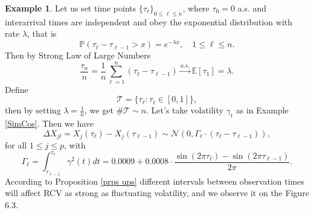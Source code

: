 \documentclass[a4paper,11pt]{book}
\theoremstyle{plain}
\theoremstyle{definition}
\newtheorem{exmp}[thm]{Example}
\newcommand{\ME}{\mathbb{E}}
\newcommand{\MP}{\mathbb{P}}
\begin{document}
    \begin{exmp} \label{PosTimes}
    	Let us set time points $ \{\tau_\ell\}_{0 \leq \ell \leq n}$, where $\tau_0 = 0$ a.s. and interarrival times are independent and obey the exponential distribution with rate $\lambda$, that is 
    	\[ \MP(\tau_{\ell} - \tau_{\ell-1} > x) =  e^{-\lambda x}, \quad 1 \leq \ell \leq n. \]
    	Then by Strong Law of Large Numbers
    	\[ \frac{\tau_n}{n} = \frac{1}{n} \sum_{\ell=1}^{n} (\tau_{\ell} - \tau_{\ell-1}) \xrightarrow{a.s.} \ME[\tau_1] = \lambda. \]
    	Define
    	\[ \mathcal{T} = \{\tau_\ell : \tau_\ell \in [0, 1]\}, \]
    	then by setting $\lambda = \frac{1}{n}$, we get $\#\mathcal{T} \sim n$.
    	Let's take volatility $\gamma_t$ as in Example \ref{SimCos}. Then we have 
    	\[ \Delta X_{jl} = X_j(\tau_\ell) - X_j(\tau_{\ell-1}) \sim \mathcal{N}(0, \Gamma_\ell \cdot (\tau_\ell - \tau_{\ell-1})), \]
    	for all $1 \leq j \leq p$, with
    	\[ \Gamma_\ell = \int_{\tau_{\ell-1}}^{\tau_\ell} \gamma^2(t)dt = 0.0009 + 0.0008\cdot \frac{ \sin(2\pi \tau_\ell )-\sin(2\pi \tau_{\ell-1} ) }{2\pi}. \]
    	According to Proposition \ref{prps ups} different intervals between observation times will affect RCV as strong as fluctuating volatility, and we observe it on the Figure 6.3.
    \end{exmp}
    
\end{document}
